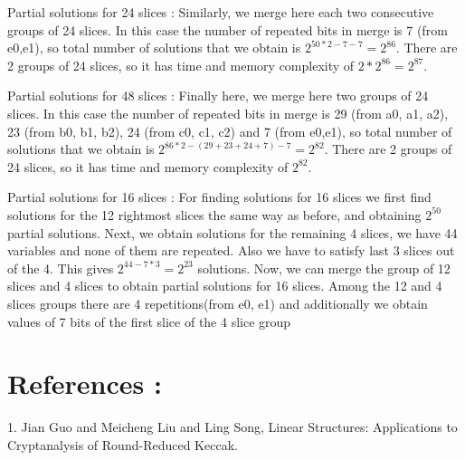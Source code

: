 \documentclass{article}
\begin{document}
\newpar
Partial solutions for 24 slices : Similarly, we merge here each two consecutive groups of 24 slices. In this case the number of repeated bits in merge is 7 (from e0,e1), so total number of solutions that we obtain is $2^{50*2 - 7 - 7 } = 2^{86}$. There are 2 groups of 24 slices, so it has time and memory complexity of $2*2^{86} = 2^{87}$.

\newpar
Partial solutions for 48 slices : Finally here, we merge here two groups of 24 slices. In this case the number of repeated bits in merge is 29 (from a0, a1, a2), 23 (from b0, b1, b2), 24 (from c0, c1, c2) and 7 (from e0,e1), so total number of solutions that we obtain is $2^{86*2 - (29 + 23 + 24 + 7) - 7 } = 2^{82}$. There are 2 groups of 24 slices, so it has time and memory complexity of $2^{82}$.

\newpar
Partial solutions for 16 slices : For finding solutions for 16 slices we first find solutions for the 12 rightmost slices the same way as before, and obtaining $2^{50}$ partial solutions. 
Next, we obtain solutions for the remaining 4 slices, we have 44 variables and none of them are repeated. Also we have to satisfy last 3 slices out of the 4. This gives $2^{44 - 7*3} = 2^{23}$ solutions.
Now, we can merge the group of 12 slices and 4 slices to obtain partial solutions for 16 slices. Among the 12 and 4 slices groups there are 4 repetitions(from e0, e1) and additionally we obtain values of 7 bits of the first slice of the 4 slice group 

\section{References :}

1. Jian Guo and Meicheng Liu and Ling Song, Linear Structures: Applications to Cryptanalysis of Round-Reduced Keccak.\newline
 
\end{document}
